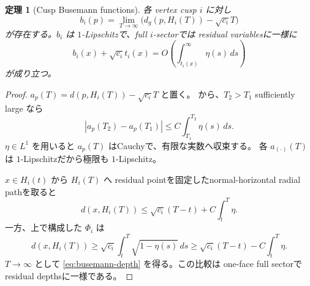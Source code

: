 \documentclass[11pt,a4paper]{ltjsarticle}
\theoremstyle{plain}
\newtheorem{theorem}{定理}[section]
\theoremstyle{definition}
\theoremstyle{remark}
\begin{document}
\begin{theorem}[Cusp Busemann functions]
\label{thm:Busemann}
各 vertex cusp $i$ に対し
\[
 b_i(p)=\lim_{T\to\infty}\bigl(d_g(p,H_i(T))-\sqrt{c_i}T\bigr)
\]
が存在する。$b_i$ は $1$-Lipschitzで、full $i$-sectorでは residual variablesに一様に
\begin{equation}
\label{eq:busemann-depth}
 b_i(x)+\sqrt{c_i}t_i(x)
 =O\left(\int_{t_i(x)}^\infty\eta(s)\,ds\right)
\end{equation}
が成り立つ。
\end{theorem}
\begin{proof}
$a_p(T)=d(p,H_i(T))-\sqrt{c_i}T$ と置く。 から、$T_2>T_1$ sufficiently large なら
\[
 |a_p(T_2)-a_p(T_1)|
 \le C\int_{T_1}^{T_2}\eta(s)\,ds.
\]
$\eta\in L^1$ を用いると $a_p(T)$ はCauchyで、有限な実数へ収束する。
各 $a_{(\cdot)}(T)$ は $1$-Lipschitzだから極限も $1$-Lipschitz。

$x\in H_i(t)$ から $H_i(T)$ へ residual pointを固定したnormal-horizontal radial pathを取ると
\[
 d(x,H_i(T))\le \sqrt{c_i}(T-t)+C\int_t^T\eta.
\]
一方、上で構成した $\Phi_i$ は
\[
 d(x,H_i(T))\ge\sqrt{c_i}\int_t^T\sqrt{1-\eta(s)}\,ds
 \ge\sqrt{c_i}(T-t)-C\int_t^T\eta.
\]
$T\to\infty$ として \eqref{eq:busemann-depth} を得る。この比較は one-face full sectorで residual depthsに一様である。
\end{proof}
\end{document}
